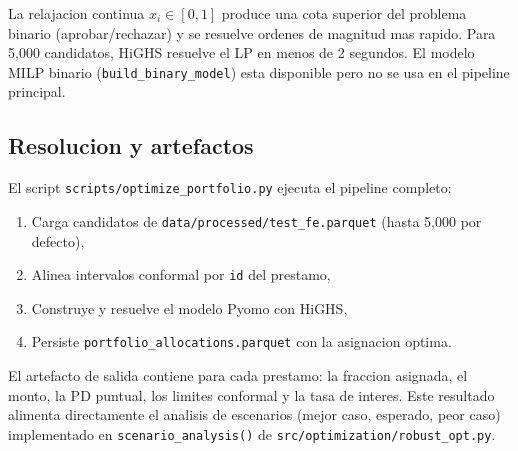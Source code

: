 \documentclass[
  spanish,
  11pt,
  letterpaper,
]{scrbook}
\providecommand{\tightlist}{%
  \setlength{\itemsep}{0pt}\setlength{\parskip}{0pt}}
\theoremstyle{plain}
\theoremstyle{remark}
\begin{document}
\begin{tcolorbox}[enhanced jigsaw, arc=.35mm, bottomrule=.15mm, bottomtitle=1mm, breakable, colback=white, colbacktitle=quarto-callout-tip-color!10!white, colframe=quarto-callout-tip-color-frame, coltitle=black, left=2mm, leftrule=.75mm, opacityback=0, opacitybacktitle=0.6, rightrule=.15mm, title=\textcolor{quarto-callout-tip-color}{\faLightbulb}\hspace{0.5em}{Variables continuas vs binarias}, titlerule=0mm, toprule=.15mm, toptitle=1mm]

La relajacion continua \(x_i \in [0, 1]\) produce una cota superior del
problema binario (aprobar/rechazar) y se resuelve ordenes de magnitud
mas rapido. Para 5,000 candidatos, HiGHS resuelve el LP en menos de 2
segundos. El modelo MILP binario (\texttt{build\_binary\_model}) esta
disponible pero no se usa en el pipeline principal.

\end{tcolorbox}

\subsection{Resolucion y artefactos}\label{resolucion-y-artefactos}

El script \texttt{scripts/optimize\_portfolio.py} ejecuta el pipeline
completo:

\begin{enumerate}
\def\labelenumi{\arabic{enumi}.}
\tightlist
\item
  Carga candidatos de \texttt{data/processed/test\_fe.parquet} (hasta
  5,000 por defecto),
\item
  Alinea intervalos conformal por \texttt{id} del prestamo,
\item
  Construye y resuelve el modelo Pyomo con HiGHS,
\item
  Persiste \texttt{portfolio\_allocations.parquet} con la asignacion
  optima.
\end{enumerate}

El artefacto de salida contiene para cada prestamo: la fraccion
asignada, el monto, la PD puntual, los limites conformal y la tasa de
interes. Este resultado alimenta directamente el analisis de escenarios
(mejor caso, esperado, peor caso) implementado en
\texttt{scenario\_analysis()} de
\texttt{src/optimization/robust\_opt.py}.
\end{document}
